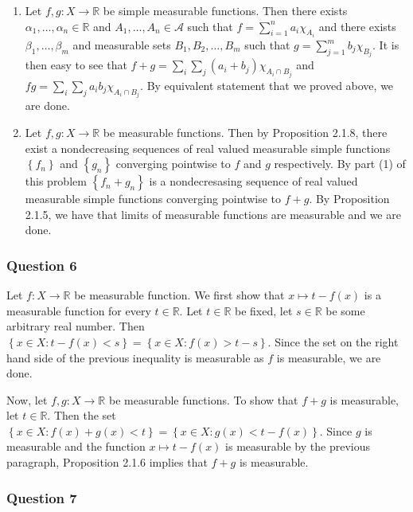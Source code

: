 \documentclass[12pt]{article}
\theoremstyle{definition}
\theoremstyle{remark}
\theoremstyle{plain}
\newcommand{\R}{\mathbb R}
\newcommand{\scrA}{{\mathscr A}}
\begin{document}
\begin{enumerate}
    \item Let $f, g: X \to \R$ be simple measurable functions. Then there exists $\alpha _1 , \ldots , \alpha _n \in \R$ and $A_1 , \ldots , A_n \in \scrA$ such that $f=\sum_{i=1}^{n} a_i \chi_{A_i}$ and 
	there exists $\beta _1 , \ldots , \beta _m$ and measurable sets $B_1 , B_2 , \ldots , B_m$ such that $g=\sum_{j=1}^{m} b_j \chi_{B_j}$. It is then easy to see that $f+g = \sum_{i}\sum_{j} \left( a_i + b_j \right) \chi_{A_i \cap B_j}$ and $fg =\sum_{i}\sum_{j} a_i b_j \chi _{A_i \cap B_j}$. By equivalent statement that we proved above, we are done.

    \item Let $f, g: X\to \R$ be measurable functions. Then by Proposition 2.1.8, there exist a nondecreasing sequences of real valued measurable simple functions $\left\{ f_n \right\}$ and $\left\{ g_n \right\}$ converging pointwise to $f$ and $g$ respectively. By part (1) of this problem $\left\{ f_n + g_n \right\}$ is a nondecresasing sequence of real valued measurable simple functions converging pointwise to $f+g$. By Proposition 2.1.5, we have that limits of measurable functions are measurable and we are done.

\end{enumerate}

\subsubsection{Question 6}
Let $f: X \to \R$ be measurable function. We first show that $x\mapsto t -f (x)$ is a measurable function for every $t\in\R$. Let $t\in \R$ be fixed, let $s\in \R$ be some arbitrary real number. Then $\left\{ x\in X : t-f(x) <s \right\}= \left\{ x\in X: f(x)>t-s \right\}$. Since the set on the right hand side of the previous inequality is measurable as $f$ is measurable, we are done.

Now, let $f,g : X \to \mathbb R$ be measurable functions. To show that $f+g$ is measurable, let $t\in\R$. Then the set $\left\{ x\in X : f(x)+g(x) <t \right\}= \left\{ x\in X: g(x) <t-f(x) \right\}$. Since $g$ is measurable and the function $x\mapsto t-f(x)$ is measurable by the previous paragraph, Proposition 2.1.6 implies that $f+g$ is measurable.

\subsubsection{Question 7}
\end{document}
